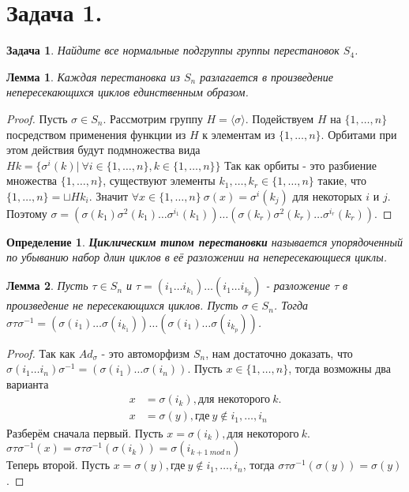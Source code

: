 \documentclass{article}
\newtheorem{task}{Задача}
\newtheorem{df}{Определение}
\newtheorem{lemma}{Лемма}
\newcommand{\icycle}[3]{(#1_{#2} \dots #1_{#3})}
\newcommand{\gen}[1]{\langle #1 \rangle}
\newcommand{\range}[2]{\{#1, \dots, #2\}}
\newcommand{\irange}[3]{#1_{#2}, \dots, #1_{#3}}
\newcommand{\ad}[2]{#1#2#1^{-1}}
\newcommand{\adcycle}[4]{(#4(#1_{#2}) \dots #4(#1_{#3}))}
\begin{document}
\section*{Задача 1.}
\begin{task}
Найдите все нормальные подгруппы группы перестановок $S_4$.
\end{task}
\begin{lemma}
 Каждая перестановка из $S_n$ разлагается в произведение непересекающихся циклов единственным образом.   
\end{lemma}
\begin{proof}
    Пусть $\sigma \in S_n$. 
    Рассмотрим группу $H = \gen{\sigma} $.
    Подействуем $H$ на $\range{1}{n}$  посредством применения функции из $H$ к элементам из $\range{1}{n}$.
    Орбитами при этом действия будут подмножества вида 
    $Hk = \{ \sigma^i(k) | ~ \forall i \in \range{1}{n},  k \in \range{1}{n} \}$ 
    Так как орбиты - это разбиение множества ${\range{1}{n}}$,
    существуют элементы ${\irange{k}{1}{r}} \in \range{1}{n}$ такие, что 
    $\range{1}{n} = \sqcup Hk_i$.
    Значит $\forall x \in \range{1}{n} ~ \sigma(x) = \sigma^i(k_j) $ для некоторых $i$ и $j$.
    Поэтому $\sigma = (\sigma(k_1)\sigma^2(k_1) \dots \sigma^{i_1}(k_1))\dots(\sigma(k_r)\sigma^2(k_r) \dots \sigma^{i_r}(k_r))$.
\end{proof}

\begin{df}
\textbf{Циклическим типом перестановки} называется упорядоченный по убыванию набор длин циклов в её разложении на непересекающиеся циклы.    
\end{df}

\begin{lemma}
    \label{sec1:action_by_conjugation}
    Пусть $\tau \in S_n$ и $\tau = \icycle{i}{1}{k_1} \dots \icycle{i}{1}{k_p}$ - 
    разложение $\tau$ в произведение не пересекающихся циклов.
    Пусть $\sigma \in S_n$.
    Тогда $\ad{\sigma}{\tau} = \adcycle{i}{1}{k_1}{\sigma} \dots \adcycle{i}{1}{k_p}{\sigma}$.
\end{lemma}
\begin{proof}
    Так как $Ad_{\sigma}$ - это автоморфизм $S_n$, 
    нам достаточно доказать, что $\ad{\sigma}{\icycle{i}{1}{n}} = \adcycle{i}{1}{n}{\sigma}$.
    Пусть $x \in \range{1}{n}$,
    тогда возможны два варианта
    \begin{align*}
        x &= \sigma(i_k), \text{для некоторого} ~ k. \\ 
        x &= \sigma(y), \text{где} ~ y \notin \irange{i}{1}{n} 
    \end{align*} 
    Разберём сначала первый. Пусть $x = \sigma(i_k), \text{для некоторого} ~ k.$ 
    $\ad{\sigma}{\tau}(x) = \ad{\sigma}{\tau}(\sigma(i_k)) = \sigma(i_{k+1 ~ mod ~ n})$ \\
    Теперь второй. Пусть $x = \sigma(y), \text{где} ~ y \notin \irange{i}{1}{n}$, тогда 
    $\ad{\sigma}{\tau}(\sigma(y)) = \sigma(y)$.
\end{proof}
\end{document}
